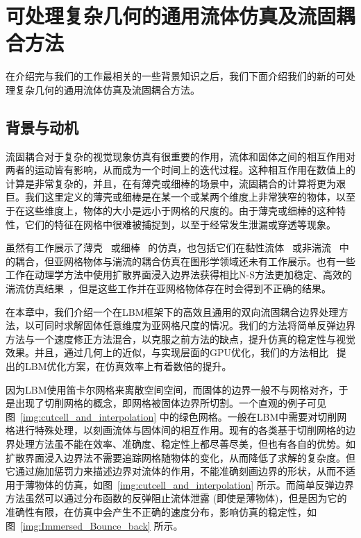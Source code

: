 \chapter{可处理复杂几何的通用流体仿真及流固耦合方法}
\label{chap:siga21}

在介绍完与我们的工作最相关的一些背景知识之后，我们下面介绍我们的新的可处理复杂几何的通用流体仿真及流固耦合方法。

\section{背景与动机}
流固耦合对于复杂的视觉现象仿真有很重要的作用，流体和固体之间的相互作用对两者的运动皆有影响，从而成为一个时间上的迭代过程。这种相互作用在数值上的计算是非常复杂的，并且，在有薄壳或细棒的场景中，流固耦合的计算将更为艰巨。我们这里定义的薄壳或细棒是在某一个或某两个维度上非常狭窄的物体，以至于在这些维度上，物体的大小是远小于网格的尺度的。由于薄壳或细棒的这种特性，它们的特征在网格中很难被捕捉到，以至于经常发生泄漏或穿透等现象。

虽然有工作展示了薄壳~\citep{DiscreteShells,Bridson:2003} 或细棒~\citep{DiscreteRods} 的仿真，也包括它们在黏性流体~\citep{Fei-2018,Takahashi:2019,Fei-2019} 或非湍流~\citep{Azevedo-2016} 中的耦合，但亚网格物体与湍流的耦合仿真在图形学领域还未有工作展示。也有一些工作在动理学方法中使用扩散界面浸入边界法获得相比N-S方法更加稳定、高效的湍流仿真结果~\citep{Li-2018,Li-2020}，但是这些工作并在亚网格物体存在时会得到不正确的结果。

在本章中，我们介绍一个在LBM框架下的高效且通用的双向流固耦合边界处理方法，以可同时求解固体任意维度为亚网格尺度的情况。我们的方法将简单反弹边界方法与一个速度修正方法混合，以克服之前方法的缺点，提升仿真的稳定性与视觉效果。并且，通过几何上的近似，与实现层面的GPU优化，我们的方法相比~\citet{Chen-2021} 提出的LBM优化方案，在仿真效率上有着数倍的提升。

因为LBM使用笛卡尔网格来离散空间空间，而固体的边界一般不与网格对齐，于是出现了切削网格的概念，即网格被固体边界所切割。一个直观的例子可见图~\ref{img:cutcell_and_interpolation} 中的绿色网格。一般在LBM中需要对切削网格进行特殊处理，以刻画流体与固体间的相互作用。现有的各类基于切削网格的边界处理方法虽不能在效率、准确度、稳定性上都尽善尽美，但也有各自的优势。如扩散界面浸入边界法不需要追踪网格随物体的变化，从而降低了求解的复杂度。但它通过施加惩罚力来描述边界对流体的作用，不能准确刻画边界的形状，从而不适用于薄物体的仿真，如图~\ref{img:cutcell_and_interpolation} 所示。而简单反弹边界方法虽然可以通过分布函数的反弹阻止流体泄露 (即使是薄物体)，但是因为它的准确性有限，在仿真中会产生不正确的速度分布，影响仿真的稳定性，如图~\ref{img:Immersed_Bounce_back} 所示。

